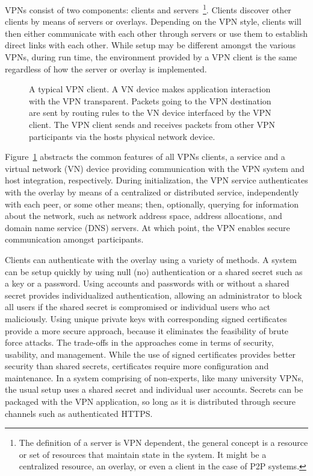 VPNs consist of two components: clients and servers~\footnote{The definition of
a server is VPN dependent, the general concept is a resource or set of
resources that maintain state in the system.  It might be a centralized
resource, an overlay, or even a client in the case of P2P systems.}.  Clients
discover other clients by means of servers or overlays.  Depending on the VPN
style, clients will then either communicate with each other through servers or
use them to establish direct links with each other.  While setup may be
different amongst the various VPNs, during run time, the environment provided
by a VPN client is the same regardless of how the server or overlay is
implemented.  

\begin{figure}
\centering
{}

\caption[A typical VPN client]{A typical VPN client.  A VN device makes
application interaction with the VPN transparent.  Packets going to the VPN
destination are sent by routing rules to the VN device interfaced by the VPN
client.  The VPN client sends and receives packets from other VPN participants
via the hosts physical network device.}

\label{fig:vpn}
\end{figure}

Figure~\ref{fig:vpn} abstracts the common features of all VPNs clients, a
service and a virtual network (VN) device providing communication with the VPN
system and host integration, respectively.  During initialization, the VPN
service authenticates with the overlay by means of a centralized or distributed
service, independently with each peer, or some other means; then, optionally,
querying for information about the network, such as network address space,
address allocations, and domain name service (DNS) servers.  At which point,
the VPN enables secure communication amongst participants.

Clients can authenticate with the overlay using a variety of methods.  A system
can be setup quickly by using null (no) authentication or a shared secret such
as a key or a password.  Using accounts and passwords with or without a shared
secret provides individualized authentication, allowing an administrator to
block all users if the shared secret is compromised or individual users who act
maliciously.  Using unique private keys with corresponding signed certificates
provide a more secure approach, because it eliminates the feasibility of brute
force attacks.  The trade-offs in the approaches come in terms of security,
usability, and management.  While the use of signed certificates provides
better security than shared secrets, certificates require more configuration
and maintenance.  In a system comprising of non-experts, like many university
VPNs, the usual setup uses a shared secret and individual user accounts.
Secrets can be packaged with the VPN application, so long as it is distributed
through secure channels such as authenticated HTTPS.

